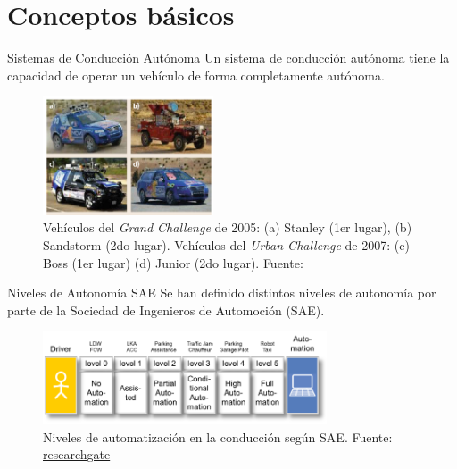 \documentclass[10pt]{beamer}
\begin{document}


\section{Conceptos básicos}

\begin{frame}{Sistemas de Conducción Autónoma}
    Un sistema de conducción autónoma tiene la capacidad de operar un vehículo 
    de forma completamente autónoma.
    \begin{figure}[!h] 
        \centering
        \includegraphics[width=0.45\textwidth]{../img/darpa}
        \caption[Vehículos del \textit{Grand Challenge}]{Vehículos del \textit{Grand Challenge} de 2005: (a) Stanley (1er lugar), (b) Sandstorm (2do lugar). Vehículos del \textit{Urban Challenge} de 2007: (c) Boss (1er lugar) (d) Junior (2do lugar). Fuente: \cite{wikipedia_2018} }
    \end{figure}
\end{frame}

\begin{frame}{Niveles de Autonomía SAE}
    Se han definido distintos niveles de autonomía por parte de la Sociedad de Ingenieros de Automoción (SAE).
    \begin{figure}[!h] 
        \centering
        \includegraphics[width=0.75\textwidth]{../img/levels}
        \caption[Niveles de automatización SAE]{Niveles de automatización en la conducción según SAE. 
        Fuente: \href{https://www.researchgate.net/figure/Terms-related-to-automated-driving-according-to-SAE-and-VDA_fig1_273883061}{researchgate} }
\end{figure}
\end{frame}
\end{document}

